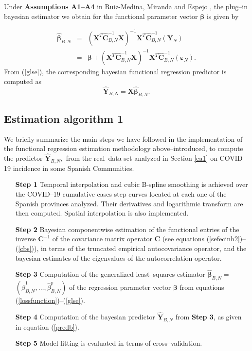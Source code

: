 \documentclass[11pt,a4paper]{article}
\begin{document}
Under \textbf{Assumptions A1--A4} in Ruiz-Medina,  Miranda and  Espejo \cite{RuizMedinaMirandaEspejo19}, the plug--in  bayesian estimator we obtain for the functional parameter vector $\boldsymbol{\beta }$ is given by

\begin{eqnarray}\widehat{\boldsymbol{\beta}}_{B,N}&=&\left(\mathbf{X}^{T}\widehat{\mathbf{C}}^{-1}_{B, N}\mathbf{X}\right)^{-1}\mathbf{X}^{T}
\widehat{\mathbf{C}}^{-1}_{B, N}(\mathbf{Y}_{N})\nonumber\\
&=&\boldsymbol{\beta}+\left(\mathbf{X}^{T}\widehat{\mathbf{C}}^{-1}_{B, N}\mathbf{X}\right)^{-1}\mathbf{X}^{T}
\widehat{\mathbf{C}}^{-1}_{B, N}(\boldsymbol{\varepsilon}_{N}).\label{glse}
\end{eqnarray}
From (\ref{glse}), the corresponding bayesian functional regression  predictor is computed as
\begin{equation}\widehat{\mathbf{Y}}_{B,N}=\mathbf{X}\widehat{\boldsymbol{\beta}}_{B,N}.\label{predb}
\end{equation}
\subsection{Estimation algorithm 1}
\label{be}
We briefly summarize the  main steps we have followed in the implementation of  the functional regression estimation methodology  above--introduced, to compute
the predictor $\widehat{\mathbf{Y}}_{B,N},$  from  the real--data set analyzed in Section \ref{ea1}  on COVID--19 incidence in some  Spanish Communities.

\begin{itemize} \item[\textbf{Step 1}] Temporal interpolation and cubic B-spline smoothing is achieved over the    COVID--19 cumulative cases step  curves located at each one of the  Spanish provinces analyzed. Their derivatives and logarithmic transform are then computed. Spatial interpolation is also implemented.
\item[\textbf{Step 2}] Bayesian componentwise estimation of the functional entries of the inverse $\mathbf{C}^{-1}$ of the covariance matrix operator $\mathbf{C}$ (see  equations  (\ref{sefecinh2})--(\ref{cbs})),
     in terms of the truncated empirical autocovariance operator, and the bayesian estimates  of the eigenvalues of the autocorrelation operator.
\item[\textbf{Step 3}] Computation of the generalized least--squares estimator $\widehat{\boldsymbol{\beta}}_{B,N}=$ \linebreak $\left(\widehat{\beta}_{B,N}^{1},\dots,\widehat{\beta}^{p}_{B,N}\right)$ of the regression parameter vector $\boldsymbol{\beta}$ from equations (\ref{lossfunction})--(\ref{glse}).
    \item[\textbf{Step 4}]  Computation of the  bayesian predictor  $\widehat{\mathbf{Y}}_{B,N}$ from \textbf{Step 3}, as given   in equation (\ref{predb}).
                 \item[\textbf{Step 5}] Model fitting is evaluated in terms of cross--validation.
\end{itemize}
\end{document}
